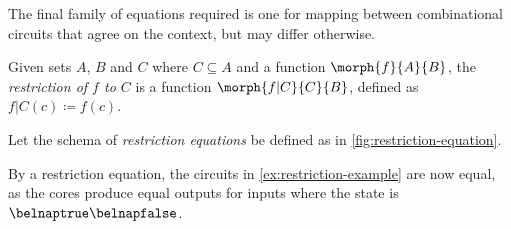The final family of equations required is one for mapping between combinational
circuits that agree on the context, but may differ otherwise.

\begin{notation}
    Given sets \(A\), \(B\) and \(C\) where \(C \subseteq A\) and a function
    \(\morph{f}{A}{B}\), the \emph{restriction of \(f\) to \(C\)} is a function
    \(\morph{f|C}{C}{B}\), defined as \(f|C(c) \coloneqq f(c)\).
\end{notation}

\begin{definition}
    Let the schema of \emph{restriction equations} be defined as in
    \cref{fig:restriction-equation}.
\end{definition}

\begin{example}
    By a restriction equation, the circuits in \cref{ex:restriction-example} are
    now equal, as the cores produce equal outputs for inputs where the state is
    \(\belnaptrue\belnapfalse\).
\end{example}
